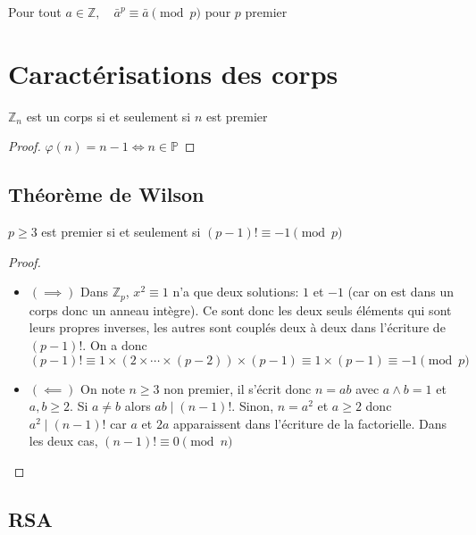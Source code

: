 \begin{cor}
     Pour tout $a\in\mathbb Z, \quad \bar a^p\equiv \bar a\pmod p$ pour $p$ premier
\end{cor}

\section{Caractérisations des corps}

\begin{prop}
    $\mathbb Z_n$ est un corps si et seulement si $n$ est premier
\end{prop}

\begin{proof}
    $\varphi(n)=n-1\iff n\in \mathbb P$
\end{proof}

\subsection{Théorème de Wilson}

\begin{res}
    $p\geq 3$ est premier si et seulement si $(p-1)!\equiv -1\pmod p$
\end{res}

\begin{proof}~
    \begin{itemize}
        \item $(\implies)$ Dans $\mathbb Z_p$, $x^2\equiv 1$ n'a que deux solutions: $1$ et $-1$ (car on est dans un corps donc un anneau intègre). Ce sont donc les deux seuls éléments qui sont leurs propres inverses, les autres sont couplés deux à deux dans l'écriture de $(p-1)!$. On a donc \[
                (p-1)!\equiv 1\times (2\times \cdots \times (p-2))\times (p-1)\equiv 1\times (p-1)\equiv -1 \pmod p
            \]
        \item $(\impliedby)$ On note $n\geq 3$ non premier, il s'écrit donc $n=ab$ avec $a\land b=1$ et $a, b\geq 2$. Si $a\neq b$ alors $ab\;|\;(n-1)!$. Sinon, $n=a^2$ et $a\geq 2$ donc $a^2\;|\;(n-1)!$ car $a$ et $2a$ apparaissent dans l'écriture de la factorielle. Dans les deux cas, $(n-1)!\equiv 0\pmod n$
    \end{itemize}
\end{proof}

\subsection{RSA}

